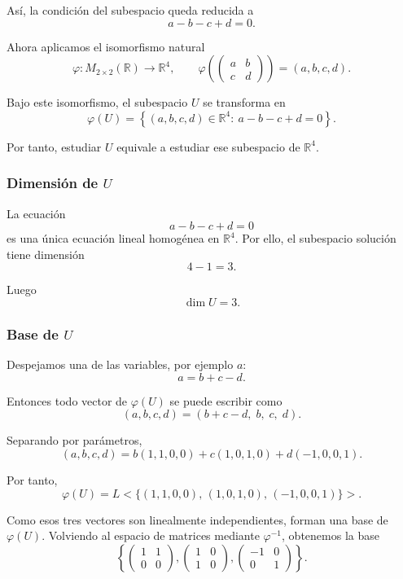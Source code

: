 \documentclass[12pt]{article}
\begin{document}
Así, la condición del subespacio queda reducida a
\[
a-b-c+d=0.
\]

Ahora aplicamos el isomorfismo natural
\[
\varphi:M_{2\times 2}(\mathbb{R})\longrightarrow \mathbb{R}^4,
\qquad
\varphi\left(
\begin{pmatrix}
a&b\\
c&d
\end{pmatrix}
\right)=(a,b,c,d).
\]

Bajo este isomorfismo, el subespacio \(U\) se transforma en
\[
\varphi(U)=\left\{(a,b,c,d)\in\mathbb{R}^4:\ a-b-c+d=0\right\}.
\]

Por tanto, estudiar \(U\) equivale a estudiar ese subespacio de \(\mathbb{R}^4\).

\subsubsection*{Dimensión de \(U\)}

La ecuación
\[
a-b-c+d=0
\]
es una única ecuación lineal homogénea en \(\mathbb{R}^4\). Por ello, el subespacio solución tiene dimensión
\[
4-1=3.
\]

Luego
\[
\dim U=3.
\]

\subsubsection*{Base de \(U\)}

Despejamos una de las variables, por ejemplo \(a\):
\[
a=b+c-d.
\]

Entonces todo vector de \(\varphi(U)\) se puede escribir como
\[
(a,b,c,d)=(b+c-d,\;b,\;c,\;d).
\]

Separando por parámetros,
\[
(a,b,c,d)
=
b(1,1,0,0)+c(1,0,1,0)+d(-1,0,0,1).
\]

Por tanto,
\[
\varphi(U)=L<\{(1,1,0,0),\,(1,0,1,0),\,(-1,0,0,1)\}>.
\]

Como esos tres vectores son linealmente independientes, forman una base de \(\varphi(U)\). Volviendo al espacio de matrices mediante \(\varphi^{-1}\), obtenemos la base
\[
\left\{
\begin{pmatrix}
1&1\\
0&0
\end{pmatrix},
\begin{pmatrix}
1&0\\
1&0
\end{pmatrix},
\begin{pmatrix}
-1&0\\
0&1
\end{pmatrix}
\right\}.
\]
\end{document}
